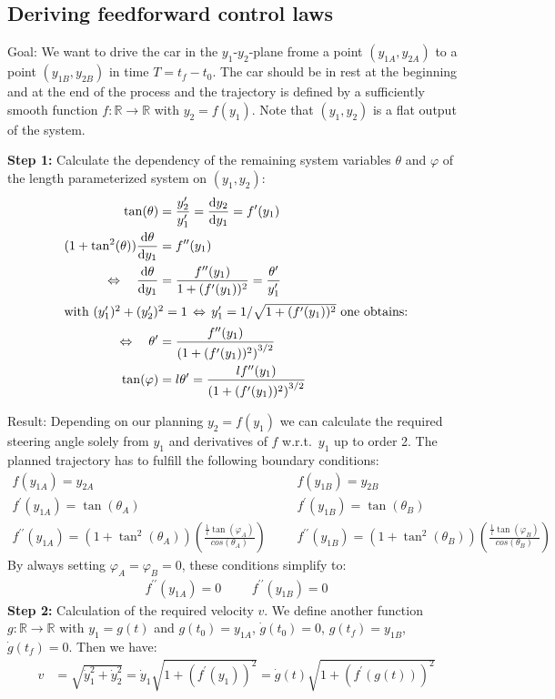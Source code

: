 \documentclass[a4paper,11pt,headings=standardclasses,parskip=half]{scrartcl}
\newcommand{\yIZ}{y_{1A}}
\newcommand{\yIIZ}{y_{2A}}
\newcommand{\yIT}{y_{1B}}
\newcommand{\yIIT}{y_{2B}}
\newcommand{\diff}[2]{\frac{\text{d}#1}{\text{d}#2}}
\begin{document}
\subsection{Deriving feedforward control laws}
Goal: We want to drive the car in the $y_1$-$y_2$-plane frome a point $(\yIZ, \yIIZ)$ to a point $(\yIT, \yIIT)$ in time $T=t_f-t_0$. The car should be in rest at the beginning and at the end of the process and the trajectory is defined by a sufficiently smooth function $f : \mathbb{R} \to \mathbb{R}$ with $y_2 = f(y_1)$. Note that $(y_1, y_2)$ is a flat output of the system.

\textbf{Step 1:} Calculate the dependency of the remaining system variables $\theta$ and $\varphi$ of the  length parameterized system on $(y_1, y_2)$:
\begin{align}
\tan(\theta) &= \frac{y_2^\prime}{y_1^\prime} = \diff{y_2}{y_1} = f^\prime(y_1)\\
(1 + \tan^2(\theta))\diff{\theta}{y_1} &= f^{\prime\prime}(y_1) \nonumber \\
\Leftrightarrow \quad \diff{\theta}{y_1}&= \frac{f^{\prime\prime}(y_1)}{1 + (f^\prime(y_1))^2} = \frac{\theta^\prime}{y_1^\prime} \nonumber\\
\intertext{with $(y_1^\prime)^2 + (y_2^\prime)^2 = 1 \, \Leftrightarrow \, y_1^\prime = 1/\sqrt{1 + (f^\prime(y_1))^2}$ one obtains:}
\Leftrightarrow \quad \theta^\prime &= \frac{f^{\prime\prime}(y_1)}{\left(1 + (f^\prime(y_1))^2\right)^{3/2}}\\
\tan(\varphi) &= l\theta^\prime = \frac{lf^{\prime\prime}(y_1)}{\left(1 + (f^\prime(y_1))^2\right)^{3/2}}
\end{align}

Result: Depending on our planning $y_2 = f(y_1)$ we can calculate the required steering angle solely from $y_1$ and derivatives of $f$ w.r.t.~$y_1$ up to order 2. The planned trajectory has to fulfill the following boundary conditions:
\begin{align*}
f(\yIZ) = \yIIZ &&& f(\yIT) = \yIIT \\
f^\prime(\yIZ) = \tan(\theta_A) &&& f^\prime(\yIT) = \tan(\theta_B) \\
f^{\prime\prime}(\yIZ) = (1+\tan^2(\theta_A))\left(\frac{\frac{1}{l}\tan(\varphi_A)}{cos(\theta_A)}\right) &&& 
f^{\prime\prime}(\yIT) = (1+\tan^2(\theta_B))\left(\frac{\frac{1}{l}\tan(\varphi_B)}{cos(\theta_B)}\right) 
\end{align*}
By always setting $\varphi_A=\varphi_B=0$, these conditions simplify to:
\begin{align*}
f^{\prime\prime}(\yIZ) = 0 &&& f^{\prime\prime}(\yIT) = 0
\end{align*}
\textbf{Step 2:} Calculation of the required velocity $v$. We define another function $g: \mathbb{R} \to \mathbb{R}$ with $y_1 = g(t)$ and $g(t_0) = \yIZ$, $\dot g(t_0) = 0$, $g(t_f) = \yIT$, $\dot g(t_f) = 0$. Then we have:
\begin{align}
v &= \sqrt{\dot y_1^2 + \dot y_2^2} = \dot y_1\sqrt{1 + (f^\prime(y_1))^2} = \dot g(t) \sqrt{1 + (f^\prime(g(t)))^2}
\end{align}
\end{document}
